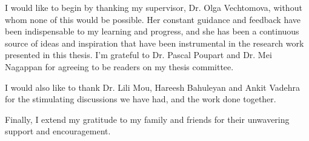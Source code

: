 I would like to begin by thanking my supervisor, Dr. Olga Vechtomova, without whom none of this would be possible. Her constant guidance and feedback have been indispensable to my learning and progress, and she has been a continuous source of ideas and inspiration that have been instrumental in the research work presented in this thesis. I'm grateful to Dr. Pascal Poupart and Dr. Mei Nagappan for agreeing to be readers on my thesis committee.

I would also like to thank Dr. Lili Mou, Hareesh Bahuleyan and Ankit Vadehra for the stimulating discussions we have had, and the work done together.

Finally, I extend my gratitude to my family and friends for their unwavering support and encouragement.

